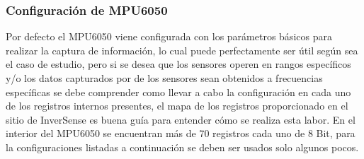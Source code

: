 \documentclass[12pt,a4paper]{article}
\begin{document}
\subsubsection{Configuración de MPU6050}
Por defecto el MPU6050 viene configurada con los parámetros básicos para realizar la captura de información, lo cual puede perfectamente ser útil según sea el caso de estudio, pero si se desea que los sensores operen en rangos específicos y/o los datos capturados por de los sensores sean obtenidos a frecuencias específicas se debe comprender como llevar a cabo la configuración en cada uno de los registros internos presentes, el mapa de los registros \cite{MAPREGISTER} proporcionado  en el sitio de InverSense es buena guía para entender cómo se realiza esta labor.
\newline En el interior del MPU6050 se encuentran más de 70 registros cada uno de 8 Bit, para la configuraciones listadas a continuación se deben ser usados solo algunos pocos.
\end{document}
